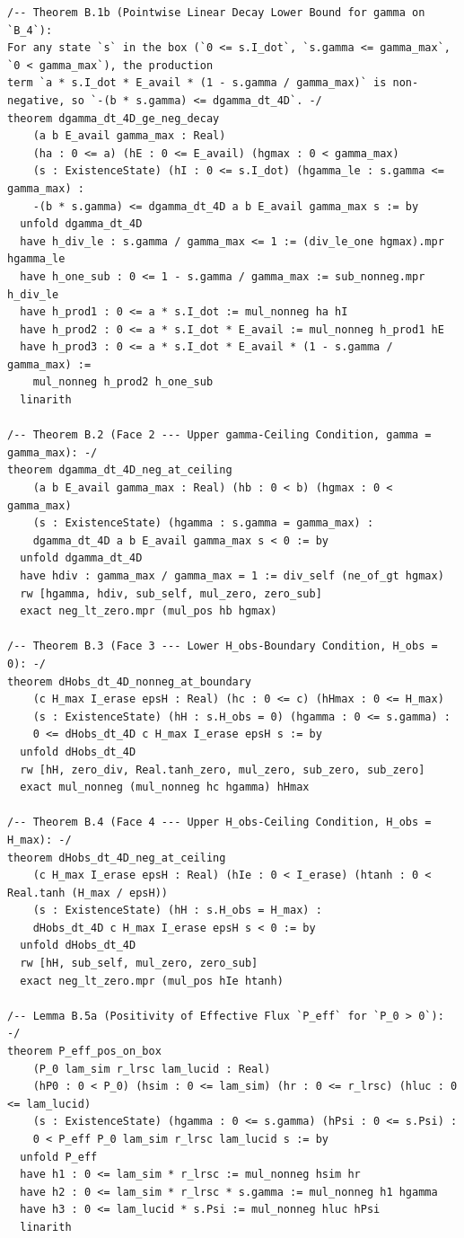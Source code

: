\documentclass[11pt,a4paper]{article}
\theoremstyle{definition}
\begin{document}
\begin{lstlisting}[language=Lean4]
/-- Theorem B.1b (Pointwise Linear Decay Lower Bound for gamma on `B_4`):
For any state `s` in the box (`0 <= s.I_dot`, `s.gamma <= gamma_max`, `0 < gamma_max`), the production
term `a * s.I_dot * E_avail * (1 - s.gamma / gamma_max)` is non-negative, so `-(b * s.gamma) <= dgamma_dt_4D`. -/
theorem dgamma_dt_4D_ge_neg_decay
    (a b E_avail gamma_max : Real)
    (ha : 0 <= a) (hE : 0 <= E_avail) (hgmax : 0 < gamma_max)
    (s : ExistenceState) (hI : 0 <= s.I_dot) (hgamma_le : s.gamma <= gamma_max) :
    -(b * s.gamma) <= dgamma_dt_4D a b E_avail gamma_max s := by
  unfold dgamma_dt_4D
  have h_div_le : s.gamma / gamma_max <= 1 := (div_le_one hgmax).mpr hgamma_le
  have h_one_sub : 0 <= 1 - s.gamma / gamma_max := sub_nonneg.mpr h_div_le
  have h_prod1 : 0 <= a * s.I_dot := mul_nonneg ha hI
  have h_prod2 : 0 <= a * s.I_dot * E_avail := mul_nonneg h_prod1 hE
  have h_prod3 : 0 <= a * s.I_dot * E_avail * (1 - s.gamma / gamma_max) :=
    mul_nonneg h_prod2 h_one_sub
  linarith

/-- Theorem B.2 (Face 2 --- Upper gamma-Ceiling Condition, gamma = gamma_max): -/
theorem dgamma_dt_4D_neg_at_ceiling
    (a b E_avail gamma_max : Real) (hb : 0 < b) (hgmax : 0 < gamma_max)
    (s : ExistenceState) (hgamma : s.gamma = gamma_max) :
    dgamma_dt_4D a b E_avail gamma_max s < 0 := by
  unfold dgamma_dt_4D
  have hdiv : gamma_max / gamma_max = 1 := div_self (ne_of_gt hgmax)
  rw [hgamma, hdiv, sub_self, mul_zero, zero_sub]
  exact neg_lt_zero.mpr (mul_pos hb hgmax)

/-- Theorem B.3 (Face 3 --- Lower H_obs-Boundary Condition, H_obs = 0): -/
theorem dHobs_dt_4D_nonneg_at_boundary
    (c H_max I_erase epsH : Real) (hc : 0 <= c) (hHmax : 0 <= H_max)
    (s : ExistenceState) (hH : s.H_obs = 0) (hgamma : 0 <= s.gamma) :
    0 <= dHobs_dt_4D c H_max I_erase epsH s := by
  unfold dHobs_dt_4D
  rw [hH, zero_div, Real.tanh_zero, mul_zero, sub_zero, sub_zero]
  exact mul_nonneg (mul_nonneg hc hgamma) hHmax

/-- Theorem B.4 (Face 4 --- Upper H_obs-Ceiling Condition, H_obs = H_max): -/
theorem dHobs_dt_4D_neg_at_ceiling
    (c H_max I_erase epsH : Real) (hIe : 0 < I_erase) (htanh : 0 < Real.tanh (H_max / epsH))
    (s : ExistenceState) (hH : s.H_obs = H_max) :
    dHobs_dt_4D c H_max I_erase epsH s < 0 := by
  unfold dHobs_dt_4D
  rw [hH, sub_self, mul_zero, zero_sub]
  exact neg_lt_zero.mpr (mul_pos hIe htanh)

/-- Lemma B.5a (Positivity of Effective Flux `P_eff` for `P_0 > 0`): -/
theorem P_eff_pos_on_box
    (P_0 lam_sim r_lrsc lam_lucid : Real)
    (hP0 : 0 < P_0) (hsim : 0 <= lam_sim) (hr : 0 <= r_lrsc) (hluc : 0 <= lam_lucid)
    (s : ExistenceState) (hgamma : 0 <= s.gamma) (hPsi : 0 <= s.Psi) :
    0 < P_eff P_0 lam_sim r_lrsc lam_lucid s := by
  unfold P_eff
  have h1 : 0 <= lam_sim * r_lrsc := mul_nonneg hsim hr
  have h2 : 0 <= lam_sim * r_lrsc * s.gamma := mul_nonneg h1 hgamma
  have h3 : 0 <= lam_lucid * s.Psi := mul_nonneg hluc hPsi
  linarith


\end{lstlisting}
\end{document}
